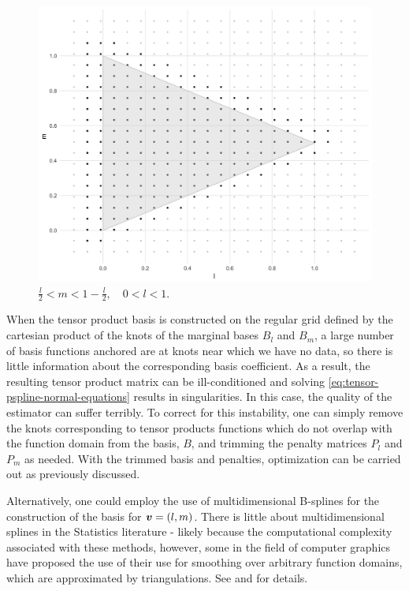 \begin{figure}[H]
    \graphicspath{{img/}}
 \includegraphics[scale=0.2]{knot-removal-on-triangle-domain.png}
 \caption{$\frac{l}{2} < m < 1 - \frac{l}{2}, \quad 0 < l < 1.$} \label{fig:triangle-domain}
 \end{figure}

When the tensor product basis is constructed on the regular grid defined by the cartesian product of the knots of the marginal bases $B_l$ and $B_m$, a large number of basis functions anchored are at knots near which we have no data, so there is little information about the corresponding basis coefficient. As a result, the resulting tensor product matrix can be ill-conditioned and solving \eqref{eq:tensor-pspline-normal-equations} results in singularities. In this case, the quality of the estimator can suffer terribly. To correct for this instability, one can simply remove the knots corresponding to tensor products functions which do not overlap with the function domain from the basis, $B$, and trimming the penalty matrices $P_l$ and $P_m$ as needed. With the trimmed basis and penalties, optimization can be carried out as previously discussed. 

\bigskip

Alternatively, one could employ the use of multidimensional B-splines for the construction of the basis for $\mbox{\boldmath $v$} = \left(l,m\right)$. There is little about multidimensional splines in the Statistics literature - likely because the computational complexity associated with these methods, however, some in the field of computer graphics have proposed the use of their use for smoothing over arbitrary function domains, which are approximated by triangulations. See \citet{dahmen1992blossoming} and \citet{seidel1991symmetric} for details. 


